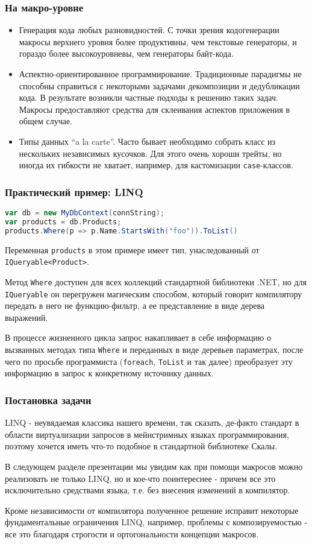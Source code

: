 \documentclass{beamer}
\begin{document}
\begin{frame}[t]
\frametitle{На макро-уровне}
\begin{itemize}
\item Генерация кода любых разновидностей. С точки зрения кодогенерации макросы верхнего уровня более продуктивны, чем текстовые генераторы, и гораздо более высокоуровневы, чем генераторы байт-кода.
\item Аспектно-ориентированное программирование. Традиционные парадигмы не способны справиться с некоторыми задачами декомпозиции и дедубликации кода. В результате возникли частные подходы к решению таких задач. Макросы предоставляют средства для склеивания аспектов приложения в общем случае.
\item Типы данных ``a la carte''. Часто бывает необходимо собрать класс из нескольких независимых кусочков. Для этого очень хороши трейты, но иногда их гибкости не хватает, например, для кастомизации \texttt{case}-классов. 
\end{itemize}
\end{frame}

\begin{frame}[fragile, t]
\frametitle{Практический пример: LINQ}

\begin{lstlisting}[language=scala]
var db = new MyDbContext(connString);
var products = db.Products;
products.Where(p => p.Name.StartsWith("foo")).ToList()
\end{lstlisting}

Переменная \texttt{products} в этом примере имеет тип, унаследованный от \texttt{IQueryable<Product>}. 

Метод \texttt{Where} доступен для всех коллекций стандартной библиотеки .NET, но для \texttt{IQueryable} он перегружен магическим способом, который говорит компилятору передать в него не функцию-фильтр, а ее представление в виде дерева выражений.

В процессе жизненного цикла запрос накапливает в себе информацию о вызванных методах типа \texttt{Where} и переданных в виде деревьев параметрах, после чего по просьбе программиста (\texttt{foreach}, \texttt{ToList} и так далее) преобразует эту информацию в запрос к конкретному источнику данных.
\end{frame}

\begin{frame}[t]
\frametitle{Постановка задачи}

LINQ - неувядаемая классика нашего времени, так сказать, де-факто стандарт в области виртуализации запросов в мейнстримных языках программирования, поэтому хочется иметь что-то подобное в стандартной библиотеке Скалы.

В следующем разделе презентации мы увидим как при помощи макросов можно реализовать не только LINQ, но и кое-что поинтереснее - причем все это исключительно средствами языка, т.е. без внесения изменений в компилятор.

Кроме независимости от компилятора полученное решение исправит некоторые фундаментальные ограничения LINQ, например, проблемы с композируемостью - все это благодаря строгости и ортогональности концепции макросов.
\end{frame}
\end{document}
